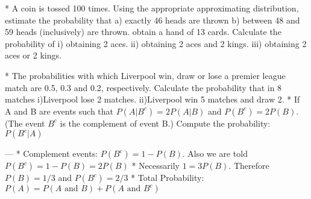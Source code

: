 
* A coin is tossed 100 times. Using the appropriate approximating distribution, estimate the probability that
a) exactly 46 heads are thrown
b) between 48 and 59 heads (inclusively) are thrown.
\itemI obtain a hand of 13 cards. Calculate the probability of
i) obtaining 2 aces.
ii) obtaining 2 aces and 2 kings.
iii) obtaining 2 aces or 2 kings.



* The probabilities with which Liverpool win, draw or lose a premier league match are 0.5, 0.3 and 0.2, respectively. Calculate the probability that in 8 matches
i)Liverpool lose 2 matches.
ii)Liverpool win 5 matches and draw 2.
* %
If A and B are events such that $P(A|B^c) = 2P(A|B)$ and $P(B^c) = 2P(B)$.
(The event $B^c$ is the complement of event B.) Compute the probability: $P(B^c|A)$ 
\begin{framed}
--- 
* Complement events: $P(B^c) = 1 - P(B)$. Also we are told $P(B^c) = 1-P(B)= 2P(B)$
* Necessarily $1 = 3P(B)$. Therefore $P(B) = 1/3$ and  $P(B^c)=2/3$
* Total Probability: $P(A) = P(A \mbox{ and } B) + P(A \mbox{ and } B^c)$

\end{framed}
